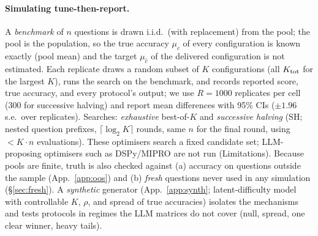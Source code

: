 \paragraph{Simulating tune-then-report.}
A \emph{benchmark} of $n$ questions is drawn i.i.d.\ (with replacement) from the pool; the pool is the population, so the true accuracy $\mu_c$ of every configuration is known exactly (pool mean) and the target $\mu_{\hat c}$ of the delivered configuration is not estimated.
Each replicate draws a random subset of $K$ configurations (all $K_{\rm tot}$ for the largest $K$), runs the search on the benchmark, and records reported score, true accuracy, and every protocol's output; we use $R=1000$ replicates per cell (300 for successive halving) and report mean differences with 95\% CIs ($\pm1.96$ s.e.\ over replicates).
Searches: \emph{exhaustive} best-of-$K$ and \emph{successive halving} (SH; nested question prefixes, $\lceil\log_2K\rceil$ rounds, same $n$ for the final round, using $<K\cdot n$ evaluations).
These optimisers search a fixed candidate set; LLM-proposing optimisers such as DSPy/MIPRO \citep{khattab2023dspy,opsahl2024mipro} are not run (Limitations).
Because pools are finite, truth is also checked against (a) accuracy on questions outside the sample (App.~\ref{app:oos}) and (b) \emph{fresh} questions never used in any simulation (\S\ref{sec:fresh}).
A \emph{synthetic} generator (App.~\ref{app:synth}; latent-difficulty model with controllable $K$, $\rho$, and spread of true accuracies) isolates the mechanisms and tests protocols in regimes the LLM matrices do not cover (null, spread, one clear winner, heavy tails).

